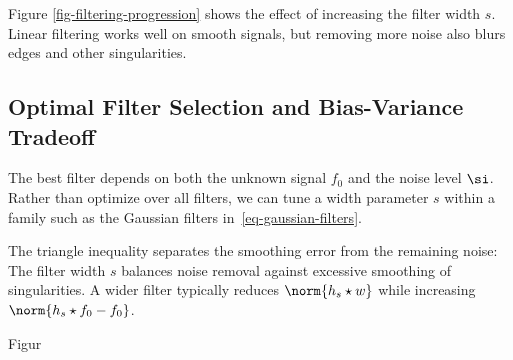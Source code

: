      
          
                                          
                                           
   
                                                                    
                  
          
                                        
                                           
   
                                                                  
                  
    

Figure \ref{fig-filtering-progression} shows the effect of increasing the filter width $s$. Linear filtering works well on smooth signals, but removing more noise also blurs edges and other singularities.


                                                     
\subsection{Optimal Filter Selection and Bias-Variance Tradeoff}
\label{subsec-optimal-selection-filter}

The best filter depends on both the unknown signal $f_0$ and the noise level $\si$. Rather than optimize over all filters, we can tune a width parameter $s$ within a family such as the Gaussian filters in~\eqref{eq-gaussian-filters}.

The triangle inequality separates the smoothing error from the remaining noise:
The filter width $s$ balances noise removal against excessive smoothing of singularities. A wider filter typically reduces $\norm{h_s \star w}$ while increasing $\norm{h_s\star f_0-f_0}$.

Figur